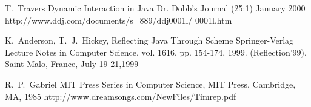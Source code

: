 \documentclass{acm_proc_article-sp}
\begin{document}
\begin{thebibliography}{1}
T.~Travers
\newblock Dynamic Interaction in Java
\newblock Dr. Dobb's Journal (25:1) January 2000
\newblock http://www.ddj.com/documents/s=889/ddj0001l/ 0001l.htm

K.~Anderson, T.~J.~Hickey,
\newblock Reflecting Java Through Scheme
\newblock Springer-Verlag Lecture Notes in Computer Science, vol. 1616, pp. 154-174, 1999.
\newblock (Reflection'99), Saint-Malo, France, July 19-21,1999

R.~P.~Gabriel
\newblock MIT Press Series in Computer Science, MIT Press, Cambridge, MA, 1985
\newblock http://www.dreamsongs.com/NewFiles/Timrep.pdf

\end{thebibliography}
\end{document}

